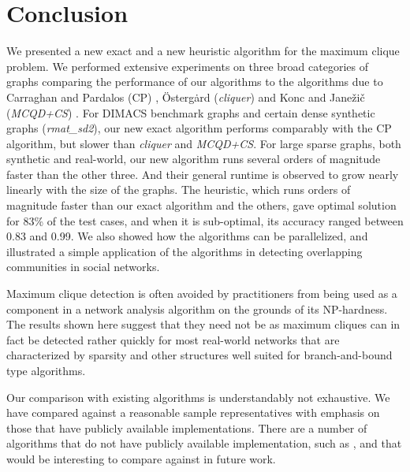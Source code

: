 \section{Conclusion}
\label{sec:conclusion}

We presented a new exact and a new heuristic algorithm for the maximum clique problem.
We performed extensive experiments on three broad categories of graphs comparing the 
performance of our algorithms to the algorithms due to
Carraghan and Pardalos (CP) \cite{pardalos},
\"{O}sterg\.{a}rd ({\it cliquer}) \cite{ostergard} and
Konc and Jane\v{z}i\v{c} ({\it MCQD+CS}) \cite{konc2007improved}.
For DIMACS benchmark graphs and certain dense synthetic graphs ({\it rmat\_sd2}), our new exact algorithm performs comparably with the CP algorithm, but slower than {\it cliquer}
and {\it MCQD+CS}. 
For large sparse graphs, both synthetic and real-world, our new algorithm runs
several orders of magnitude faster than the other three. 
And their general runtime is observed to grow nearly linearly with the size of the graphs. 
The heuristic, which runs orders of magnitude faster than our exact algorithm and the others, gave optimal solution for 83\% of the test cases, and when it is sub-optimal, its accuracy ranged between 0.83 and 0.99.
We also showed how the algorithms can be parallelized, and illustrated a simple application of the algorithms in detecting overlapping communities in social networks. 

Maximum clique detection is often avoided by practitioners from being used as a component in 
a network analysis algorithm on the grounds of its NP-hardness. The results shown here suggest that they need
not be as maximum cliques can in fact be detected rather quickly for most real-world networks that are characterized by sparsity and other structures well suited for branch-and-bound type algorithms.

Our comparison with existing algorithms is understandably not exhaustive.
We have compared against a reasonable sample representatives with emphasis on those
that have publicly available implementations. There are a number of algorithms that do not have publicly available implementation, such as \cite{walcom,AAAI101611}, and that would be interesting to compare against in future work. 
